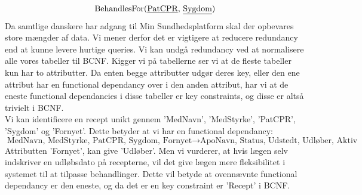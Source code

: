 \begin{equation*}
\textrm{BehandlesFor}(\textrm{\underline{PatCPR}, \underline{Sygdom}})
\end{equation*}
Da samtlige danskere har adgang til Min Sundhedsplatform skal der opbevares store mængder af data. Vi mener derfor det er vigtigere at reducere redundancy end at kunne levere hurtige queries. Vi kan undgå redundancy ved at normalisere alle vores tabeller til BCNF. Kigger vi på tabellerne ser vi at de fleste tabeller kun har to attributter. Da enten begge attributter udgør deres key, eller den ene attribut har en functional dependancy over i den anden attribut, har vi at de eneste functional dependancies i disse tabeller er key constraints, og disse er altså trivielt i BCNF.\\
Vi kan identificere en recept unikt gennem 'MedNavn', 'MedStyrke', 'PatCPR', 'Sygdom' og 'Fornyet'. Dette betyder at vi har en functional dependancy:
\begin{equation*}
	\textrm{MedNavn, MedStyrke, PatCPR, Sygdom, Fornyet} \to \textrm{ApoNavn, Status, Udstedt, Udløber, Aktiv}
\end{equation*}
Attributten 'Fornyet', kan give 'Udløber'. Men vi vurderer, at hvis lægen selv indskriver en udløbsdato på recepterne, vil det give lægen mere fleksibilitet i systemet til at tilpasse behandlinger. Dette vil betyde at ovennævnte functional dependancy er den eneste, og da det er en key constraint er 'Recept' i BCNF. 

